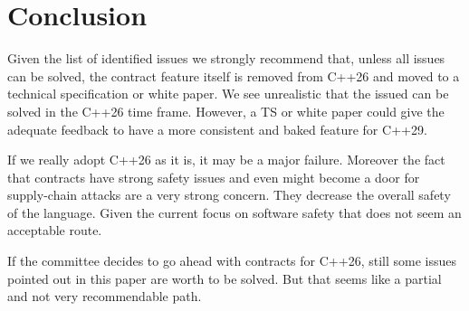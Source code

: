 \section{Conclusion}

Given the list of identified issues we strongly recommend that, unless all
issues can be solved, the contract feature itself is removed from C++26 and
moved to a technical specification or white paper. We see unrealistic that the
issued can be solved in the C++26 time frame. However, a TS or white paper could
give the adequate feedback to have a more consistent and baked feature for
C++29.

If we really adopt C++26 as it is, it may be a major failure. Moreover the fact
that contracts have strong safety issues and even might become a door for
supply-chain attacks are a very strong concern. They decrease the overall safety
of the language. Given the current focus on software safety that does not seem
an acceptable route.

If the committee decides to go ahead with contracts for C++26, still some issues
pointed out in this paper are worth to be solved. But that seems like a partial
and not very recommendable path.
